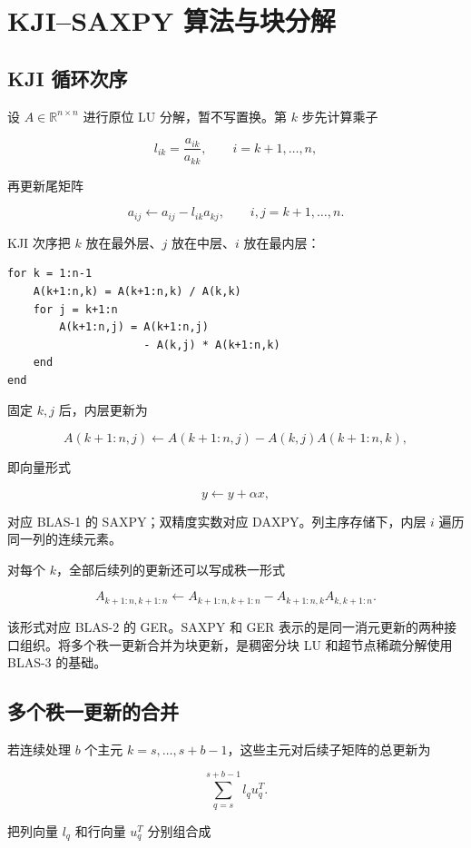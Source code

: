 \chapter{KJI--SAXPY 算法与块分解}

\section{KJI 循环次序}

设 $A\in\mathbb{R}^{n\times n}$ 进行原位 LU 分解，暂不写置换。第 $k$ 步先计算乘子

\[
l_{ik}=\frac{a_{ik}}{a_{kk}},
\qquad i=k+1,\ldots,n,
\]

再更新尾矩阵

\[
a_{ij}\leftarrow a_{ij}-l_{ik}a_{kj},
\qquad i,j=k+1,\ldots,n.
\]

KJI 次序把 $k$ 放在最外层、$j$ 放在中层、$i$ 放在最内层：

\begin{lstlisting}
for k = 1:n-1
    A(k+1:n,k) = A(k+1:n,k) / A(k,k)
    for j = k+1:n
        A(k+1:n,j) = A(k+1:n,j)
                     - A(k,j) * A(k+1:n,k)
    end
end
\end{lstlisting}

固定 $k,j$ 后，内层更新为

\[
A(k+1:n,j)\leftarrow
A(k+1:n,j)-A(k,j)A(k+1:n,k),
\]

即向量形式

\[
y\leftarrow y+\alpha x,
\]

对应 BLAS-1 的 SAXPY；双精度实数对应 DAXPY。列主序存储下，内层 $i$ 遍历同一列的连续元素。

对每个 $k$，全部后续列的更新还可以写成秩一形式

\[
A_{k+1:n,k+1:n}\leftarrow
A_{k+1:n,k+1:n}
-A_{k+1:n,k}A_{k,k+1:n}.
\]

该形式对应 BLAS-2 的 GER。SAXPY 和 GER 表示的是同一消元更新的两种接口组织。将多个秩一更新合并为块更新，是稠密分块 LU 和超节点稀疏分解使用 BLAS-3 的基础\cite{davis2006,demmel1999}。

\section{多个秩一更新的合并}

若连续处理 $b$ 个主元 $k=s,\ldots,s+b-1$，这些主元对后续子矩阵的总更新为

\[
\sum_{q=s}^{s+b-1}l_qu_q^T.
\]

把列向量 $l_q$ 和行向量 $u_q^T$ 分别组合成

